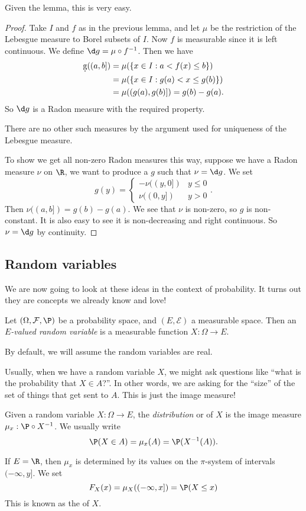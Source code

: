 \documentclass[a4paper]{article}
\begin{document}
Given the lemma, this is very easy.
\begin{proof}
  Take $I$ and $f$ as in the previous lemma, and let $\mu$ be the restriction of the Lebesgue measure to Borel subsets of $I$. Now $f$ is measurable since it is left continuous. We define $\d g = \mu \circ f^{-1}$. Then we have
  \begin{align*}
    \d g((a, b]) &= \mu(\{x \in I: a < f(x) \leq b\}) \\
    &= \mu(\{x \in I: g(a) < x \leq g(b)\}) \\
    &= \mu((g(a), g(b)]) = g(b) - g(a).
  \end{align*}
  So $\d g$ is a Radon measure with the required property.

  There are no other such measures by the argument used for uniqueness of the Lebesgue measure.

  To show we get all non-zero Radon measures this way, suppose we have a Radon measure $\nu$ on $\R$, we want to produce a $g$ such that $\nu = \d g$. We set
  \[
    g(y) =
    \begin{cases}
      -\nu ((y, 0]) & y \leq 0\\
      \nu((0, y]) & y > 0
    \end{cases}.
  \]
  Then $\nu((a, b]) = g(b) - g(a)$. We see that $\nu$ is non-zero, so $g$ is non-constant. It is also easy to see it is non-decreasing and right continuous. So $\nu = \d g$ by continuity.
\end{proof}

\subsection{Random variables}
We are now going to look at these ideas in the context of probability. It turns out they are concepts we already know and love!

\begin{defi}
  Let $(\Omega, \mathcal{F}, \P)$ be a probability space, and $(E, \mathcal{E})$ a measurable space. Then an \emph{$E$-valued random variable} is a measurable function $X: \Omega \to E$.

  By default, we will assume the random variables are real.
\end{defi}
Usually, when we have a random variable $X$, we might ask questions like ``what is the probability that $X \in A$?''. In other words, we are asking for the ``size'' of the set of things that get sent to $A$. This is just the image measure!
\begin{defi}
  Given a random variable $X: \Omega \to E$, the \emph{distribution} or  of $X$ is the image measure $\mu_x: \P \circ X^{-1}$. We usually write
  \[
    \P(X \in A) = \mu_x(A) = \P(X^{-1}(A)).
  \]
\end{defi}
If $E = \R$, then $\mu_x$ is determined by its values on the $\pi$-system of intervals $(-\infty, y]$. We set
\[
  F_X(x) = \mu_X((-\infty, x]) = \P(X \leq x)
\]
This is known as the  of $X$.
\end{document}
